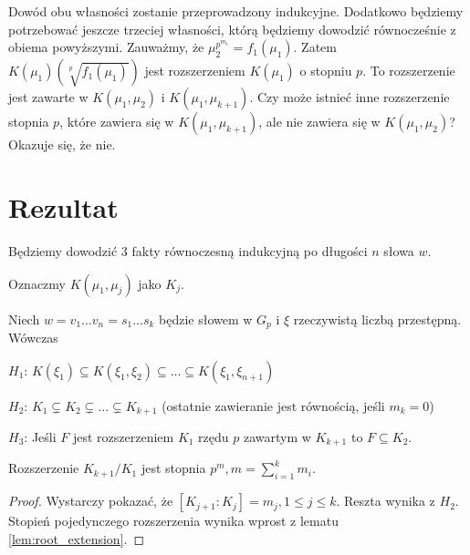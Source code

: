 Dowód obu własności zostanie przeprowadzony indukcyjne. Dodatkowo będziemy
potrzebować jeszcze trzeciej własności, którą będziemy dowodzić równocześnie z
obiema powyższymi. Zauważmy, że $\mu_2^{p^{m_1}} = f_1\left(\mu_1\right)$.
Zatem $K\left(\mu_1\right)\left(\sqrt[p]{f_1\left(\mu_1\right)}\right)$ jest
rozszerzeniem $K\left(\mu_1\right)$ o stopniu $p$.
To rozszerzenie jest zawarte w $K\left(\mu_1, \mu_2\right)$ i
$K\left(\mu_1, \mu_{k+1}\right)$.
Czy może istnieć inne rozszerzenie stopnia $p$, które zawiera się w
$K\left(\mu_1, \mu_{k+1}\right)$, ale nie zawiera się w $K\left(\mu_1,
\mu_2\right)$? Okazuje się, że nie.

\section{Rezultat}

Będziemy dowodzić 3 fakty równoczesną indukcyjną po długości $n$ słowa $w$.

Oznaczmy $K\left(\mu_1, \mu_j\right)$ jako $K_j$.

\begin{theorem}
  Niech $w = v_1 \ldots v_n = s_1 \ldots s_k$ będzie słowem w $G_p$ i $\xi$
  rzeczywistą liczbą przestępną. Wówczas

  \begin{description}
    \item{$H_1$:}
      $K\left(\xi_1\right)\subseteq
      K\left(\xi_1, \xi_2\right)\subseteq
      \ldots \subseteq
      K\left(\xi_1, \xi_{n+1}\right)$
    \item{$H_2$:}
      $K_1 \subsetneq K_2 \subsetneq \ldots \subsetneq K_{k+1}$ (ostatnie zawieranie jest
      równością, jeśli $m_k = 0$)
    \item{$H_3$:}
      Jeśli $F$ jest rozszerzeniem $K_1$ rzędu $p$ zawartym w $K_{k+1}$
      to $F \subseteq K_2$.
  \end{description}
  \label{th:hypothesis_h}
\end{theorem}

\begin{corollary}
  Rozszerzenie $K_{k+1}/K_1$ jest stopnia $p^m, m = \sum_{i=1}^k m_i$.
\end{corollary}

\begin{proof}
  Wystarczy pokazać, że $\left[K_{j + 1} : K_j\right]
  = m_j, 1 \leq j \leq k$. Reszta wynika z $H_2$.  Stopień pojedynczego
  rozszerzenia wynika wprost z lematu \ref{lem:root_extension}.
\end{proof}

